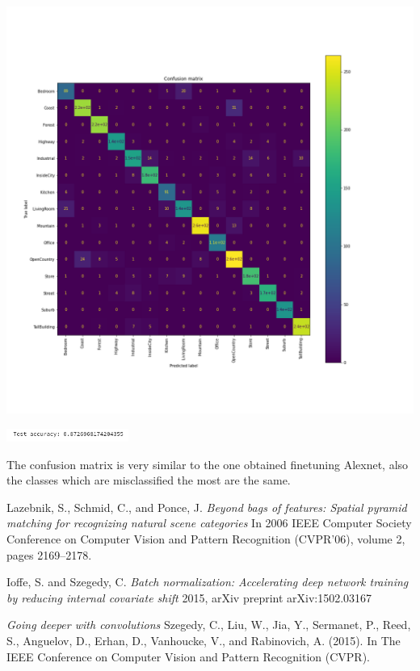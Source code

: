 \documentclass[12pt, a4paper]{report}
\begin{document}
\begin{center}
	\includegraphics[width=\textwidth]{img/confusion_multiclassSVM.png}	
\end{center}
\includegraphics[width=0.3\textwidth]{img/test_accuracy_multiSVM.png}

The confusion matrix is very similar to the one obtained finetuning Alexnet, also the classes which are misclassified the most are the same.

\begin{thebibliography}{9}
	
	Lazebnik, S., Schmid, C., and Ponce, J.
	\textit{Beyond bags of features: Spatial pyramid matching for recognizing natural scene
	categories}
	In 2006 IEEE Computer Society Conference on Computer Vision	and Pattern Recognition (CVPR’06), volume 2, pages 2169–2178.
	
	Ioffe, S. and Szegedy, C.
	\textit{Batch normalization: Accelerating deep network training by reducing internal covariate shift}
	2015, arXiv	preprint arXiv:1502.03167
	
	\textit{Going deeper with convolutions}
	Szegedy, C., Liu, W., Jia, Y., Sermanet, P., Reed, S., Anguelov, D., Erhan, D., Vanhoucke, V., and Rabinovich, A. (2015). In The IEEE Conference on Computer Vision and Pattern Recognition (CVPR).
	
\end{thebibliography}
\end{document}
